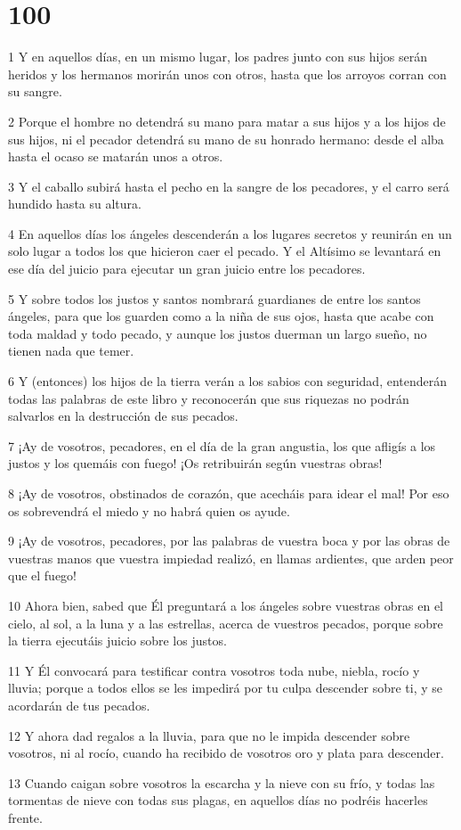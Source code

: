 \chapter{100}

\par 1 Y en aquellos días, en un mismo lugar, los padres junto con sus hijos serán heridos y los hermanos morirán unos con otros, hasta que los arroyos corran con su sangre.
\par 2 Porque el hombre no detendrá su mano para matar a sus hijos y a los hijos de sus hijos, ni el pecador detendrá su mano de su honrado hermano: desde el alba hasta el ocaso se matarán unos a otros.
\par 3 Y el caballo subirá hasta el pecho en la sangre de los pecadores, y el carro será hundido hasta su altura.
\par 4 En aquellos días los ángeles descenderán a los lugares secretos y reunirán en un solo lugar a todos los que hicieron caer el pecado. Y el Altísimo se levantará en ese día del juicio para ejecutar un gran juicio entre los pecadores.
\par 5 Y sobre todos los justos y santos nombrará guardianes de entre los santos ángeles, para que los guarden como a la niña de sus ojos, hasta que acabe con toda maldad y todo pecado, y aunque los justos duerman un largo sueño, no tienen nada que temer.
\par 6 Y (entonces) los hijos de la tierra verán a los sabios con seguridad, entenderán todas las palabras de este libro y reconocerán que sus riquezas no podrán salvarlos en la destrucción de sus pecados.
\par 7 ¡Ay de vosotros, pecadores, en el día de la gran angustia, los que afligís a los justos y los quemáis con fuego! ¡Os retribuirán según vuestras obras!
\par 8 ¡Ay de vosotros, obstinados de corazón, que acecháis para idear el mal! Por eso os sobrevendrá el miedo y no habrá quien os ayude.
\par 9 ¡Ay de vosotros, pecadores, por las palabras de vuestra boca y por las obras de vuestras manos que vuestra impiedad realizó, en llamas ardientes, que arden peor que el fuego!
\par 10 Ahora bien, sabed que Él preguntará a los ángeles sobre vuestras obras en el cielo, al sol, a la luna y a las estrellas, acerca de vuestros pecados, porque sobre la tierra ejecutáis juicio sobre los justos.
\par 11 Y Él convocará para testificar contra vosotros toda nube, niebla, rocío y lluvia; porque a todos ellos se les impedirá por tu culpa descender sobre ti, y se acordarán de tus pecados.
\par 12 Y ahora dad regalos a la lluvia, para que no le impida descender sobre vosotros, ni al rocío, cuando ha recibido de vosotros oro y plata para descender.
\par 13 Cuando caigan sobre vosotros la escarcha y la nieve con su frío, y todas las tormentas de nieve con todas sus plagas, en aquellos días no podréis hacerles frente.

